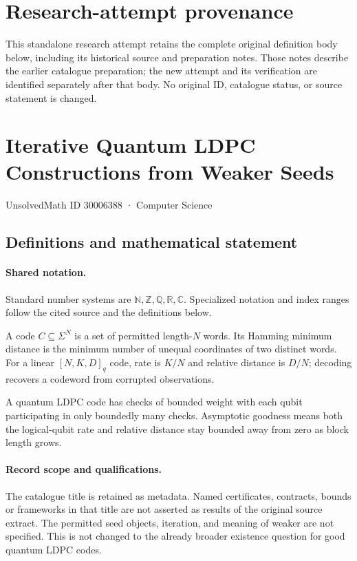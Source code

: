 \documentclass[11pt]{article}
\begin{document}
\section*{Research-attempt provenance}
This standalone research attempt retains the complete original definition body below,
including its historical source and preparation notes. Those notes describe the
earlier catalogue preparation; the new attempt and its verification are identified
separately after that body. No original ID, catalogue status, or source statement is changed.

\section{Iterative Quantum LDPC Constructions from Weaker Seeds}\label{30006388}
{\small UnsolvedMath ID 30006388 · Computer Science}
\subsection{Definitions and mathematical statement}

\paragraph{Shared notation.}Standard number systems are $\mathbb N,\mathbb Z,\mathbb Q,\mathbb R,\mathbb C$. Specialized notation and index ranges follow the cited source and the definitions below.


A code $C\subseteq\Sigma^N$ is a set of permitted length-$N$ words. Its Hamming minimum distance is the minimum number of unequal coordinates of two distinct words. For a linear $[N,K,D]_q$ code, rate is $K/N$ and relative distance is $D/N$; decoding recovers a codeword from corrupted observations.

A quantum LDPC code has checks of bounded weight with each qubit participating in only boundedly many checks. Asymptotic goodness means both the logical-qubit rate and relative distance stay bounded away from zero as block length grows.
\paragraph{Record scope and qualifications.}
The catalogue title is retained as metadata. Named certificates, contracts, bounds or frameworks in that title are not asserted as results of the original source extract.
The permitted seed objects, iteration, and meaning of weaker are not specified. This is not changed to the already broader existence question for good quantum LDPC codes.
\end{document}
